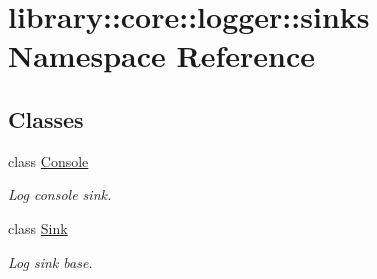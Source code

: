 \hypertarget{namespacelibrary_1_1core_1_1logger_1_1sinks}{}\section{library\+::core\+::logger\+::sinks Namespace Reference}
\label{namespacelibrary_1_1core_1_1logger_1_1sinks}
\subsection*{Classes}
\begin{DoxyCompactItemize}
\item 
class \mbox{\hyperlink{classlibrary_1_1core_1_1logger_1_1sinks_1_1_console}{Console}}
\begin{DoxyCompactList}\small\item\em Log console sink. \end{DoxyCompactList}\item 
class \mbox{\hyperlink{classlibrary_1_1core_1_1logger_1_1sinks_1_1_sink}{Sink}}
\begin{DoxyCompactList}\small\item\em Log sink base. \end{DoxyCompactList}\end{DoxyCompactItemize}
